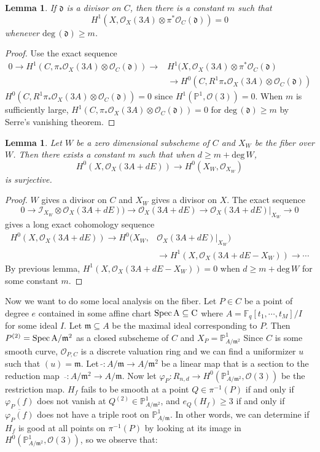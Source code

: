 \documentclass[12pt]{article}
\theoremstyle{plain}
\newtheorem{lemma}[equation]{Lemma}
\theoremstyle{definition}
\newcommand{\fd}{\mathfrak{d}}
\newcommand{\fm}{\mathfrak{m}}
\newcommand{\IF}{\mathbb{F}}
\newcommand{\IP}{\mathbb{P}}
\newcommand{\sO}{\mathcal{O}}
\newcommand{\shI}{\mathscr{I}}
\renewcommand{\deg}{\mathrm{deg}\,}
\newcommand{\Spec}{\rm Spec\,}
\newcommand\tensor{{\otimes}}
\newcommand\wb{\overline}
\newcommand{\<}{\langle}
\renewcommand{\>}{\rangle}
\def\wt{\widetilde}
\begin{document}
\begin{lemma}
If $\fd$ is a divisor on $C$, then there is a constant $m$ such that 
$$ H^1(X, \sO_X(3A) \tensor \pi^* \sO_C(\fd) ) = 0 $$ whenever $\deg(\fd) \ge m$. 
\end{lemma}
\begin{proof}
Use the exact sequence 
\begin{align*}
0 \to H^1(C, \pi_* \sO_X(3A) \tensor \sO_C(\fd)) \to  & H^1(X, \sO_X(3A) \tensor \pi^* \sO_C(\fd)  \\ 
& \to H^0(C, R^1 \pi_* \sO_X(3A) \tensor \sO_C(\fd))
\end{align*}
$H^0(C, R^1 \pi_* \sO_X(3A) \tensor \sO_C(\fd)) = 0$ since $H^1(\IP^1, \sO(3)) = 0$. When $m$ is sufficiently large, $H^1(C, \pi_* \sO_X(3A) \tensor \sO_C(\fd)) = 0$ for $\deg(\fd) \ge m$ by Serre's vanishing theorem. 
\end{proof}


\begin{lemma}
\label{Serre}
Let $W$ be a zero dimensional subscheme of $C$ and $X_W$ be the fiber over $W$. Then there exists a constant $m$ such that when $d \ge m + \deg W$, 
$$ H^0(X, \sO_X(3A + dE)) \to H^0(X_W, \sO_{X_W}) $$
is surjective. 
\end{lemma}
\begin{proof}
$W$ gives a divisor on $C$ and $X_W$ gives a divisor on $X$. The exact sequence 
$$ 0 \to \shI_{X_W} \tensor \sO_X(3A + dE) ) \to \sO_X(3A + dE) \to \sO_X(3A + dE)|_{X_W} \to 0$$
gives a long exact cohomology sequence 
\begin{align*} H^0(X, \sO_X(3A + dE)) \to H^0(X_W, &\sO_X(3A + dE)|_{X_W}) \\ &\to H^1(X, \sO_X(3A + dE - X_W)) \to \cdots 
\end{align*}
By previous lemma, $H^1(X, \sO_X(3A + dE - X_W)) = 0$ when $d \ge m + \deg W$ for some constant $m$.
\end{proof}

Now we want to do some local analysis on the fiber. Let $P \in C$ be a point of degree $e$ contained in some affine chart $\Spec A \subseteq C$ where $ A = \IF_q[t_1, \cdots, t_M]/I$ for some ideal $I$. Let $\fm \subseteq A$ be the maximal ideal corresponding to $P$. Then $P^{(2)} = \Spec A/\fm^2$ as a closed subscheme of $C$ and $X_P = \IP^1_{A/\fm^2}$ Since $C$ is some smooth curve, $\sO_{P, C}$ is a discrete valuation ring and we can find a uniformizer $u$ such that $(u) = \fm$.  Let $\, \wt{} : A/\fm \to A/\fm^2$ be a linear map that is a section to the reduction map $\, \wb{} : A/\fm^2 \to A/\fm$. Now let $\varphi_P : R_{n, d} \to H^0(\IP^1_{A/\fm^2}, \sO(3))$ be the restriction map. $H_f$ fails to be smooth at a point $Q \in \pi^{-1}(P)$ if and only if $\varphi_P(f)$ does not vanish at $Q^{(2)} \in \IP^1_{A/\fm^2}$, and $e_Q(H_f) \ge 3$ if and only if $\wb{\varphi_P(f)}$ does not have a triple root on $\IP^1_{A/\fm}$. In other words, we can determine if $H_f$ is good at all points on $\pi^{-1}(P)$ by looking at its image in $H^0(\IP^1_{A/\fm^2}, \sO(3))$, so we observe that:
\end{document}
